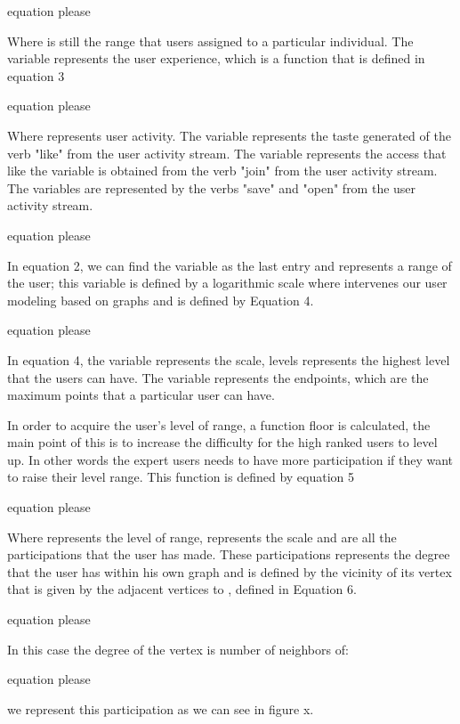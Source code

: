 equation please

Where  is still the range that users assigned to a particular individual. The variable represents the user experience, which is a function that is defined in equation 3

equation please

Where  represents user activity. The variable  represents the taste generated of the verb "like" from the user activity stream.
The variable  represents the access that like the variable  is obtained from the verb "join" from the user activity stream. The variables are represented by the verbs "save" and "open" from the user activity stream.

equation please

In equation 2, we can find the variable  as the last entry and represents a range of the user; this variable is defined by a logarithmic scale where intervenes our user modeling based on graphs and is defined by Equation 4.

equation please

In equation 4, the variable  represents the scale, levels represents the highest level that the users can have. The variable  represents the endpoints, which are the maximum points that a particular user can have.

In order to acquire the user's level of range, a function floor is calculated, the main point of this is to increase the difficulty for the high ranked users to level up. In other words the expert users needs to have more participation if they want to raise their level range. This function is defined by equation 5

equation please

Where  represents the level of range,  represents the scale and  are all the participations  that the user has made. These participations represents the degree that the user has within his own graph and is defined by the vicinity of its vertex  that is given by the adjacent vertices to , defined in Equation 6.

equation please

In this case the degree of the vertex is number of neighbors of: 

equation please

we represent this participation as we can see in figure x.









